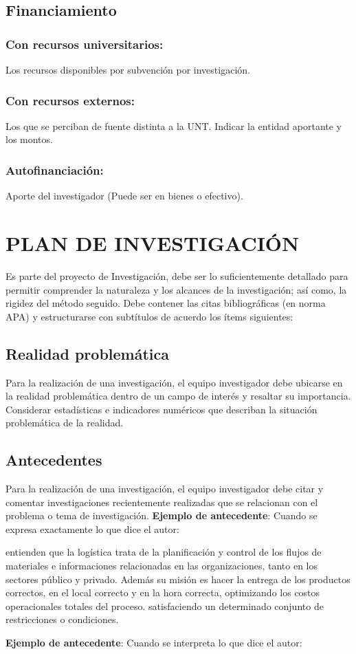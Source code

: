 \documentclass[a4paper, 12pt]{article}
\begin{document}
\subsection{Financiamiento}
\subsubsection{ {\bf	Con recursos universitarios:}}  Los recursos disponibles por subvención por investigación.
\subsubsection{ {\bf Con recursos externos:}} Los que se perciban de fuente distinta a la UNT. Indicar la entidad aportante y los montos.
\subsubsection{ {\bf Autofinanciación:}} Aporte del investigador (Puede ser en bienes o efectivo).




\section{PLAN DE INVESTIGACIÓN}
Es  parte del proyecto de Investigación,  debe ser lo suficientemente detallado para permitir comprender la naturaleza y los alcances de la investigación; así como, la rigidez del método seguido. Debe contener las citas bibliográficas (en norma APA) y estructurarse con  subtítulos de acuerdo los ítems siguientes:

\subsection{Realidad problemática}
Para la realización de una investigación, el equipo investigador debe ubicarse en la realidad problemática dentro de un campo de interés y resaltar su importancia. Considerar estadísticas e indicadores numéricos que describan la situación problemática de la realidad.

\subsection{Antecedentes}
Para la realización de una investigación, el equipo investigador debe 
citar y comentar investigaciones recientemente realizadas que se relacionan con el problema o tema de investigación.
\vskip 0.3cm
{\bf Ejemplo de antecedente}: Cuando se expresa exactamente lo que dice el autor:\par
\vskip 0.3cm
\cite{Ghiani} entienden que la logística trata de la planificación y control de los flujos de materiales e informaciones relacionadas en las organizaciones, tanto en los sectores público y privado. Además su misión es hacer la entrega de los productos correctos, en el local correcto y en la hora correcta, optimizando los costos operacionales totales del proceso.
satisfaciendo un determinado conjunto de restricciones o condiciones.\par
\vskip 0.4cm
{\bf Ejemplo de antecedente}: Cuando se interpreta lo que dice el autor:\par
\end{document}
